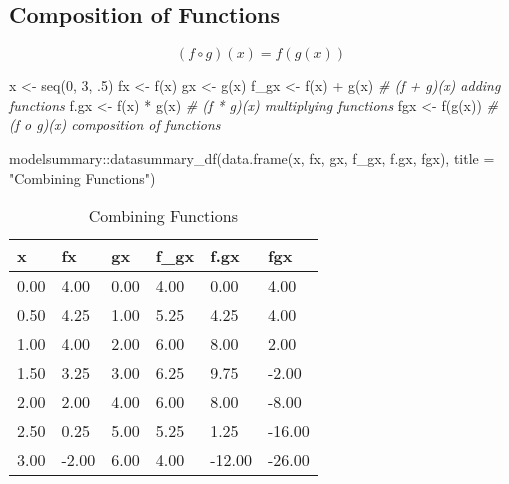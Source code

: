 \documentclass[
]{book}
\newenvironment{Shaded}{\begin{snugshade}}{\end{snugshade}}
\newcommand{\AttributeTok}[1]{\textcolor[rgb]{0.77,0.63,0.00}{#1}}
\newcommand{\CommentTok}[1]{\textcolor[rgb]{0.56,0.35,0.01}{\textit{#1}}}
\newcommand{\DecValTok}[1]{\textcolor[rgb]{0.00,0.00,0.81}{#1}}
\newcommand{\FunctionTok}[1]{\textcolor[rgb]{0.00,0.00,0.00}{#1}}
\newcommand{\NormalTok}[1]{#1}
\newcommand{\OtherTok}[1]{\textcolor[rgb]{0.56,0.35,0.01}{#1}}
\newcommand{\SpecialCharTok}[1]{\textcolor[rgb]{0.00,0.00,0.00}{#1}}
\newcommand{\StringTok}[1]{\textcolor[rgb]{0.31,0.60,0.02}{#1}}
\begin{document}
\hypertarget{composition-of-functions}{%
\subsection{Composition of Functions}\label{composition-of-functions}}

\[
(f \circ g)(x) = f(g(x)) \label{eq:comp}
\]

\begin{Shaded}
\begin{Highlighting}[]
\NormalTok{x }\OtherTok{\textless{}{-}} \FunctionTok{seq}\NormalTok{(}\DecValTok{0}\NormalTok{, }\DecValTok{3}\NormalTok{, .}\DecValTok{5}\NormalTok{)}
\NormalTok{fx }\OtherTok{\textless{}{-}} \FunctionTok{f}\NormalTok{(x)}
\NormalTok{gx }\OtherTok{\textless{}{-}} \FunctionTok{g}\NormalTok{(x)}
\NormalTok{f\_gx }\OtherTok{\textless{}{-}} \FunctionTok{f}\NormalTok{(x) }\SpecialCharTok{+} \FunctionTok{g}\NormalTok{(x)   }\CommentTok{\# (f + g)(x) adding functions}
\NormalTok{f.gx }\OtherTok{\textless{}{-}} \FunctionTok{f}\NormalTok{(x) }\SpecialCharTok{*} \FunctionTok{g}\NormalTok{(x)   }\CommentTok{\# (f * g)(x) multiplying functions}
\NormalTok{fgx }\OtherTok{\textless{}{-}} \FunctionTok{f}\NormalTok{(}\FunctionTok{g}\NormalTok{(x))        }\CommentTok{\# (f o g)(x) composition of functions}

\NormalTok{modelsummary}\SpecialCharTok{::}\FunctionTok{datasummary\_df}\NormalTok{(}\FunctionTok{data.frame}\NormalTok{(x, fx, gx, f\_gx, f.gx, fgx), }\AttributeTok{title =} \StringTok{"Combining Functions"}\NormalTok{)}
\end{Highlighting}
\end{Shaded}

\begin{table}

\caption{\label{tab:tabfg}Combining Functions}
\centering
\begin{tabular}[t]{llllll}
\toprule
x & fx & gx & f\_gx & f.gx & fgx\\
\midrule
0.00 & 4.00 & 0.00 & 4.00 & 0.00 & 4.00\\
0.50 & 4.25 & 1.00 & 5.25 & 4.25 & 4.00\\
1.00 & 4.00 & 2.00 & 6.00 & 8.00 & 2.00\\
1.50 & 3.25 & 3.00 & 6.25 & 9.75 & -2.00\\
2.00 & 2.00 & 4.00 & 6.00 & 8.00 & -8.00\\
2.50 & 0.25 & 5.00 & 5.25 & 1.25 & -16.00\\
3.00 & -2.00 & 6.00 & 4.00 & -12.00 & -26.00\\
\bottomrule
\end{tabular}
\end{table}
\end{document}

